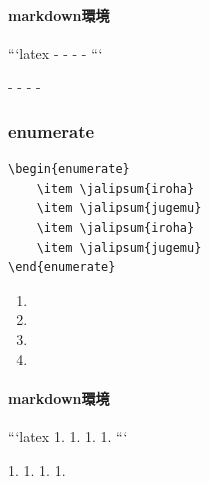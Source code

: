 \documentclass[article, head_space=25truemm, foot_space=15truemm, gutter=15truemm]{jlreq}
\begin{document}
\paragraph{markdown環境}

\begin{markdown}
```latex
- 
- 
- 
- 
```
\end{markdown}

\begin{markdown}
- 
- 
- 
- 
\end{markdown}

\subsubsection{enumerate}

\begin{verbatim}
\begin{enumerate}
    \item \jalipsum{iroha}
    \item \jalipsum{jugemu}
    \item \jalipsum{iroha}
    \item \jalipsum{jugemu}
\end{enumerate}
\end{verbatim}

\begin{enumerate}
    \item {}
    \item {}
    \item {}
    \item {}
\end{enumerate}

\paragraph{markdown環境}

\begin{markdown}
```latex
1. 
1. 
1. 
1. 
```
\end{markdown}

\begin{markdown}
1. 
1. 
1. 
1. 
\end{markdown}
\end{document}
